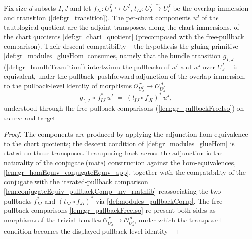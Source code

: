 \begin{lemma}\leanok
  \label{lem:gr_tautologicalQuotientComponent_transpose}
  Fix size-\(d\) subsets \(I, J\) and let \(f_{IJ} : U^I_J \hookrightarrow U^I\),
  \(t_{IJ} : U^I_J \xrightarrow{\sim} U^J_I\) be the overlap immersion and transition
  (\cref{def:gr_transition}). The per-chart components \(u^I\) of the tautological quotient
  are the adjoint transposes, along the chart immersions, of the chart quotients
  \cref{def:gr_chart_quotient} (precomposed with the free-pullback comparison). Their
  descent compatibility -- the hypothesis the gluing primitive \cref{def:gr_modules_glueHom}
  consumes, namely that the bundle transition \(g_{I,J}\) (\cref{def:gr_bundleTransition})
  intertwines the pullbacks of \(u^I\) and \(u^J\) over \(U^I_J\) -- is equivalent, under the
  pullback--pushforward adjunction of the overlap immersion, to the pullback-level identity
  of morphisms \(\mathcal{O}_{U^I_J}^{\,r} \to \mathcal{O}_{U^I_J}^{\,d}\)
  \[
    g_{I,J} \,\circ\, f_{IJ}^{*}\,u^I
      \;=\; (t_{IJ} \circ f_{JI})^{*}\,u^J,
  \]
  understood through the free-pullback comparisons (\cref{lem:gr_pullbackFreeIso}) on
  source and target.
\end{lemma}
\begin{proof}
  The components are produced by applying the adjunction hom-equivalence to the chart
  quotients; the descent condition of \cref{def:gr_modules_glueHom} is stated on those
  transposes. Transposing back across the adjunction is the naturality of the conjugate
  (mate) construction against the hom-equivalences, \cref{lem:gr_homEquiv_conjugateEquiv_app},
  together with the compatibility of the conjugate with the iterated-pullback comparison
  \cref{lem:conjugateEquiv_pullbackComp_inv_mathlib} reassociating the two pullbacks
  \(f_{IJ}^{*}\) and \((t_{IJ}\circ f_{JI})^{*}\) via \cref{def:modules_pullbackComp}. The
  free-pullback comparisons \cref{lem:gr_pullbackFreeIso} re-present both sides as morphisms
  of the trivial bundles \(\mathcal{O}_{U^I_J}^{\,r} \to \mathcal{O}_{U^I_J}^{\,d}\), under
  which the transposed condition becomes the displayed pullback-level identity.
\end{proof}

